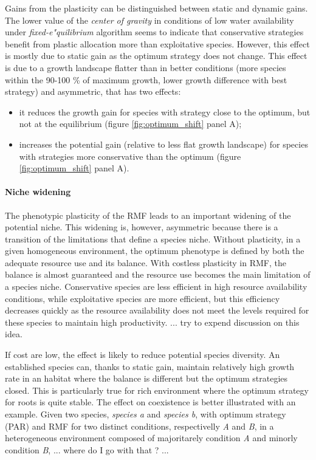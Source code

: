 Gains from the plasticity can be distinguished between static and dynamic gains. The lower value of the \textit{center of gravity} in conditions of low water availability under \textit{fixed-e"quilibrium} algorithm seems to indicate that conservative strategies benefit from plastic allocation more than exploitative species. However, this effect is mostly due to static gain as the optimum strategy does not change. This 
effect is due to a growth landscape flatter than in better conditions (more species within the 90-100 \% of maximum growth, lower growth difference with best strategy) and asymmetric, that has two effects:
\begin{itemize}
\item it reduces the growth gain for species with strategy close to the optimum, but not at the equilibrium (figure \ref{fig:optimum_shift} panel A);
\item increases the potential gain (relative to less flat growth landscape) for species with strategies more conservative than the optimum (figure \ref{fig:optimum_shift} panel A).
\end{itemize}



\paragraph{Niche widening}

The phenotypic plasticity of the RMF leads to an important widening of the potential niche. This widening is, however, asymmetric because there is a transition of the limitations that define a species niche. Without plasticity, in a given homogeneous environment, the optimum phenotype is defined by both the adequate resource use and its balance. With costless plasticity in RMF, the balance is almost guaranteed and the resource use becomes the main limitation of a species niche. Conservative species are less efficient in high resource availability conditions, while exploitative species are more efficient, but this efficiency decreases quickly as the resource availability does not meet the levels required for these species to maintain high productivity.
 ... try to expend discussion on this idea.
 
 If cost are low, the effect is likely to reduce potential species diversity. An established species can, thanks to static gain, maintain relatively high growth rate in an habitat where the balance is different but the optimum strategies closed. This is particularly true for rich environment where the optimum strategy for roots is quite stable. The effect on coexistence is better illustrated with an example. Given two species, \textit{species a} and \textit{species b}, with optimum strategy (PAR) and RMF for two distinct conditions, respectivelly \textit{A} and \textit{B}, in a heterogeneous environment composed of majoritarely condition \textit{A} and minorly condition \textit{B}, ... where do I go with that ? ... 

